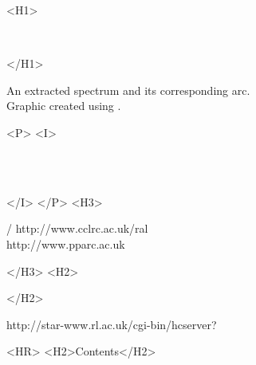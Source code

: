 \begin{htmlonly}
   \xlabel{}
   \begin{rawhtml} <H1> \end{rawhtml}
      \stardoctitle\\
   \begin{rawhtml} </H1> \end{rawhtml}

   \begin{figure}[h]
   \epsfysize=100mm
   \end{figure}

   An extracted spectrum and its corresponding arc.\\
   Graphic created using \cite{dipso}.

   \begin{rawhtml} <P> <I> \end{rawhtml}
   \stardoccategory \stardocnumber \\
   \stardocauthors \\
   \stardocdate
   \begin{rawhtml} </I> </P> <H3> \end{rawhtml}
       /
                        {http://www.cclrc.ac.uk/ral} \\
                        {http://www.pparc.ac.uk} \\
   \begin{rawhtml} </H3> <H2> \end{rawhtml}
   \begin{rawhtml} </H2> \end{rawhtml}
      {http://star-www.rl.ac.uk/cgi-bin/hcserver?\stardocsource}\\

  \label{stardoccontents}
  \begin{rawhtml}
    <HR>
    <H2>Contents</H2>
  \end{rawhtml}
  \renewcommand{\latexonlytoc}[0]{}


\end{htmlonly}
